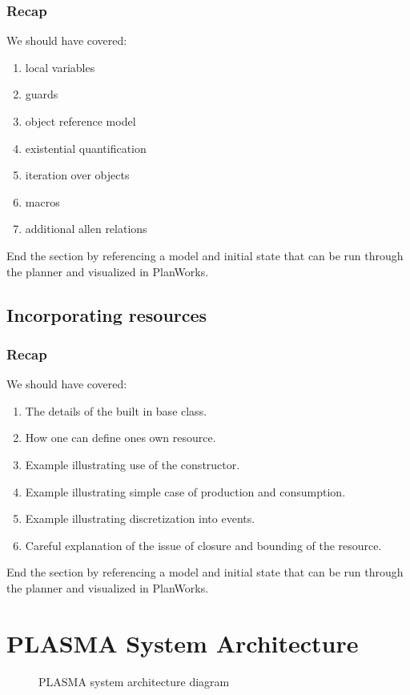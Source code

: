\documentclass[10pt, letterpaper, twoside]{article}
\begin{document}
\subsubsection{Recap}
We should have covered:
\begin{enumerate}
\item local variables
\item guards
\item object reference model
\item existential quantification
\item iteration over objects
\item macros
\item additional allen relations
\end{enumerate}
End the section by referencing a model and initial state that can be
run through the planner and visualized in PlanWorks.

\subsection{Incorporating resources}
\subsubsection{Recap}
We should have covered:
\begin{enumerate}
\item The details of the built in base class. 
\item How one can define ones own resource.
\item Example illustrating use of the constructor.
\item Example illustrating simple case of production and consumption.
\item Example illustrating discretization into events.
\item Careful explanation of the issue of closure and bounding of the resource.
\end{enumerate}
End the section by referencing a model and initial state that can be
run through the planner and visualized in PlanWorks.

\section{PLASMA System Architecture}

\begin{figure}[t]
\centering{}
\caption{PLASMA system architecture diagram}
\label{SystemDiagram}
\end{figure}
\end{document}
